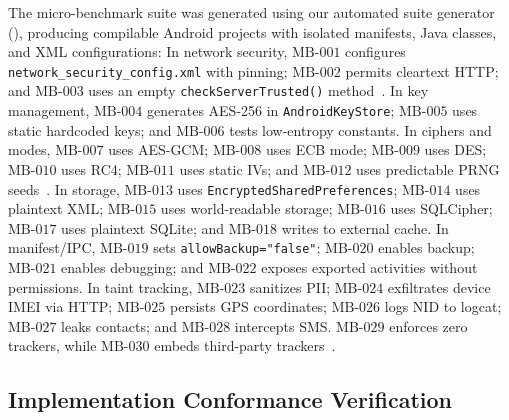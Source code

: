 The micro-benchmark suite was generated using our automated suite generator (), producing compilable Android projects with isolated manifests, Java classes, and XML configurations:
In network security, $\text{MB-001}$ configures \texttt{network\_security\_config.xml} with pinning; $\text{MB-002}$ permits cleartext HTTP; and $\text{MB-003}$ uses an empty \texttt{checkServerTrusted()} method~\cite{fahl_msc}.
In key management, $\text{MB-004}$ generates AES-256 in \texttt{AndroidKeyStore}; $\text{MB-005}$ uses static hardcoded keys; and $\text{MB-006}$ tests low-entropy constants.
In ciphers and modes, $\text{MB-007}$ uses AES-GCM; $\text{MB-008}$ uses ECB mode; $\text{MB-009}$ uses DES; $\text{MB-010}$ uses RC4; $\text{MB-011}$ uses static IVs; and $\text{MB-012}$ uses predictable PRNG seeds~\cite{crypto_misuse_ccs}.
In storage, $\text{MB-013}$ uses \texttt{EncryptedSharedPreferences}; $\text{MB-014}$ uses plaintext XML; $\text{MB-015}$ uses world-readable storage; $\text{MB-016}$ uses SQLCipher; $\text{MB-017}$ uses plaintext SQLite; and $\text{MB-018}$ writes to external cache.
In manifest/IPC, $\text{MB-019}$ sets \texttt{allowBackup="false"}; $\text{MB-020}$ enables backup; $\text{MB-021}$ enables debugging; and $\text{MB-022}$ exposes exported activities without permissions.
In taint tracking, $\text{MB-023}$ sanitizes PII; $\text{MB-024}$ exfiltrates device IMEI via HTTP; $\text{MB-025}$ persists GPS coordinates; $\text{MB-026}$ logs NID to logcat; $\text{MB-027}$ leaks contacts; and $\text{MB-028}$ intercepts SMS. $\text{MB-029}$ enforces zero trackers, while $\text{MB-030}$ embeds third-party trackers~\cite{binns_third_party_trackers}.

\subsection{Implementation Conformance Verification}
\label{sec:benchmark:results}

